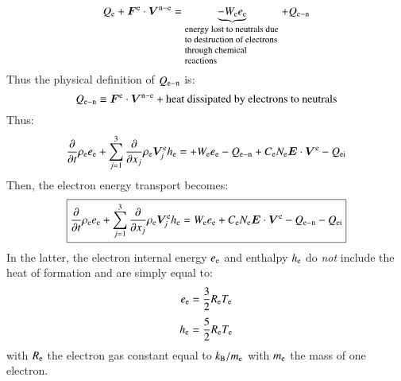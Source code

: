 \documentclass{warpdoc}
\newcommand\frameeqn[1]{\fbox{$\displaystyle #1$}}
\renewcommand{\vec}[1]{\bm{#1}}
\begin{document}
%
\begin{equation}
Q_{{\rm e}} + \vec{F}^{\rm e}\cdot  \vec{V}^{{\rm n}-{\rm e}}
=\underbrace{-W_{\rm e} e_{\rm e}}_{\begin{minipage}{3cm} \footnotesize \flushleft energy lost to neutrals due to destruction of electrons through chemical reactions\end{minipage}}
+ Q_{\rm e-n}
\end{equation}
%
Thus the physical definition of  $Q_{\rm e-n}$ is:
%
\begin{equation}
Q_{\rm e-n} \equiv \vec{F}^{\rm e}\cdot  \vec{V}^{{\rm n}-{\rm e}} + \textrm{heat dissipated by electrons to neutrals}
\label{eqn:Qen_definition}
\end{equation}
%
Thus:
%
\begin{equation}
 \frac{\partial }{\partial t}\rho_{\rm e} e_{\rm e} + \sum_{j=1}^3  \frac{\partial }{\partial x_j} \rho_{\rm e} \vec{V}^{\rm e}_j h_{\rm e} 
= 
+ W_{\rm e} e_{\rm e}
- Q_{\rm e-n}
+   C_{\rm e} N_{\rm e} \vec{E} \cdot \vec{V}^{\rm e}  
- Q_{\rm ei}
\end{equation}
%  
Then, the electron energy transport becomes:
%
\begin{equation}
\frameeqn{
 \frac{\partial }{\partial t}\rho_{\rm e} e_{\rm e} + \sum_{j=1}^3  \frac{\partial }{\partial x_j} \rho_{\rm e} \vec{V}^{\rm e}_j h_{\rm e} 
= 
 W_{\rm e} e_{\rm e}
+   C_{\rm e} N_{\rm e} \vec{E} \cdot \vec{V}^{\rm e}  
- Q_{\rm e-n}
- Q_{\rm ei}
}
\label{eqn:eelectron5}
\end{equation}
%  
In the latter, the electron internal energy $e_{\rm e}$ and enthalpy $h_{\rm e}$ do \emph{not} include the heat of formation and are simply equal to:
%
\begin{equation}
  e_{\rm e}=\frac{3}{2} R_{\rm e} T_{\rm e}
\end{equation}
%
%
\begin{equation}
  h_{\rm e}=\frac{5}{2} R_{\rm e} T_{\rm e}
\end{equation}
%
with $R_{\rm e}$ the electron gas constant equal to $k_{\rm B}/m_{\rm e}$ with $m_{\rm e}$ the mass of one electron. 
\end{document}
